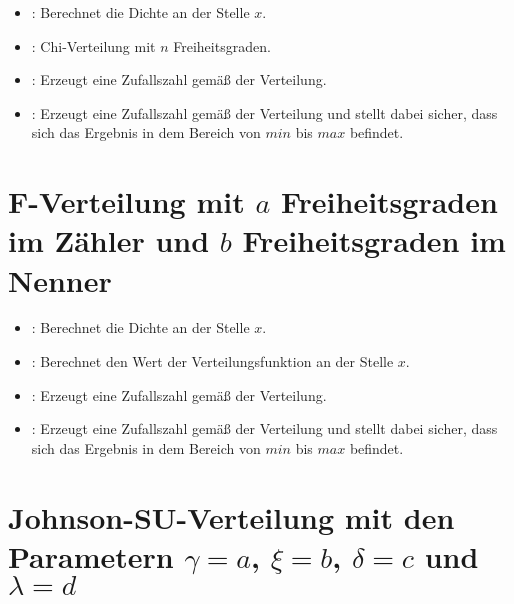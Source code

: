 \begin{itemize}

\item
{}:
Berechnet die Dichte an der Stelle $x$.

\item
{}:
Chi-Verteilung mit $n$ Freiheitsgraden.

\item
{}:
Erzeugt eine Zufallszahl gemäß der Verteilung.

\item
{}:
Erzeugt eine Zufallszahl gemäß der Verteilung und stellt dabei sicher, dass sich das Ergebnis in dem Bereich von $min$ bis $max$ befindet.

\end{itemize}



\section{F-Verteilung mit \texorpdfstring{$a$}{a} Freiheitsgraden im Zähler und \texorpdfstring{$b$}{b} Freiheitsgraden im Nenner}

\begin{itemize}

\item
{}:
Berechnet die Dichte an der Stelle $x$.

\item
{}:
Berechnet den Wert der Verteilungsfunktion an der Stelle $x$.

\item
{}:
Erzeugt eine Zufallszahl gemäß der Verteilung.

\item
{}:
Erzeugt eine Zufallszahl gemäß der Verteilung und stellt dabei sicher, dass sich das Ergebnis in dem Bereich von $min$ bis $max$ befindet.

\end{itemize}



\section{Johnson-SU-Verteilung mit den Parametern \texorpdfstring{$\gamma=a$}{a}, \texorpdfstring{$\xi=b$}{b}, \texorpdfstring{$\delta=c$}{c} und \texorpdfstring{$\lambda=d$}{d}}

